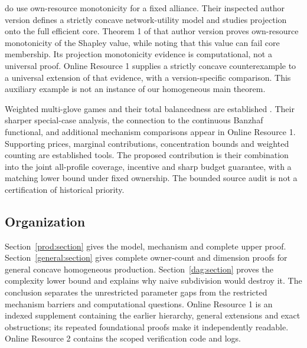 \documentclass[11pt]{article}
\theoremstyle{definition}\newtheorem{definition}[theorem]{Definition}
\theoremstyle{remark}\newtheorem{remark}[theorem]{Remark}
\begin{document}
\citet{ABV} do use own-resource monotonicity for a fixed alliance. Their
inspected author version defines a strictly concave network-utility model
and studies projection onto the full efficient core. Theorem 1 of that author version proves
own-resource monotonicity of the Shapley value, while noting that this value
can fail core membership. Its projection monotonicity evidence is computational,
not a universal proof. Online
Resource 1 supplies a strictly concave counterexample to a universal
extension of that evidence, with a version-specific comparison. This
auxiliary example is not an instance of our homogeneous main theorem.

Weighted multi-glove games and their total balancedness are established
\citep{MorettiNorde}. Their sharper special-case analysis, the connection to
the continuous Banzhaf functional, and additional mechanism comparisons appear
in Online Resource 1. Supporting prices, marginal contributions, concentration
bounds and weighted counting are established tools. The proposed contribution
is their combination into the joint all-profile coverage, incentive and sharp
budget guarantee, with a matching lower bound under fixed ownership. The
bounded source audit is not a certification of historical priority.

\subsection{Organization}
Section~\ref{prod:section} gives the model, mechanism and complete upper proof.
Section~\ref{general:section} gives complete owner-count and dimension proofs
for general concave homogeneous production. Section~\ref{dag:section} proves
the complexity lower bound and explains why naive subdivision would destroy
it. The conclusion separates the unrestricted parameter gaps from the
restricted mechanism barriers and computational questions. Online Resource 1 is an
indexed supplement containing the earlier hierarchy, general extensions and
exact obstructions; its repeated foundational proofs make it independently
readable. Online Resource 2 contains the scoped verification code and logs.
\end{document}
